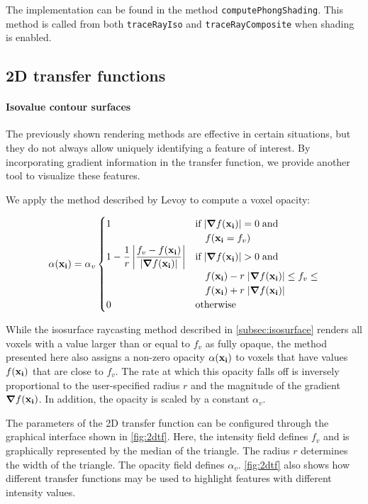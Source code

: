 \documentclass[a4paper]{article}
\begin{document}
The implementation can be found in the method {\tt computePhongShading}. This method is called from both {\tt traceRayIso} and {\tt traceRayComposite} when shading is enabled.

\subsection{2D transfer functions}

\paragraph{Isovalue contour surfaces}

The previously shown rendering methods are effective in certain situations, but they do not always allow uniquely identifying a feature of interest. By incorporating gradient information in the transfer function, we provide another tool to visualize these features.

We apply the method described by Levoy\citep{levoy_1988} to compute a voxel opacity:

\begin{equation*}
\alpha(\vb{x_i}) = \alpha_v
\begin{cases}
  1 &\text{if}\;|\grad f(\vb{x_i})| = 0\;\text{and}\\
  &\quad f(\vb{x_i} = f_v)\\
  1 - \dfrac{1}{r} \left| \dfrac{f_v - f(\vb{x_i})}{|\grad f(\vb{x_i})|}\right| &\text{if}\; |\grad f(\vb{x_i})| > 0\;\text{and}\;\\
  &\quad f(\vb{x_i}) - r\; |\grad f(\vb{x_i})| \leq f_v \leq\\
  &\quad f(\vb{x_i}) + r\; |\grad f(\vb{x_i})|\\
  0 &\text{otherwise}
\end{cases}
\end{equation*}

While the isosurface raycasting method described in \autoref{subsec:isosurface} renders all voxels with a value larger than or equal to $f_v$ as fully opaque, the method presented here also assigns a non-zero opacity $\alpha(\vb{x_i})$ to voxels that have values $f(\vb{x_i})$ that are close to $f_v$. The rate at which this opacity falls off is inversely proportional to the user-specified radius $r$ and the magnitude of the gradient $\grad f(\vb{x_i})$. In addition, the opacity is scaled by a constant $\alpha_v$.

The parameters of the 2D transfer function can be configured through the graphical interface shown in \autoref{fig:2dtf}. Here, the intensity field defines $f_v$ and is graphically represented by the median of the triangle. The radius $r$ determines the width of the triangle. The opacity field defines $\alpha_v$. \autoref{fig:2dtf} also shows how different transfer functions may be used to highlight features with different intensity values.
\end{document}
